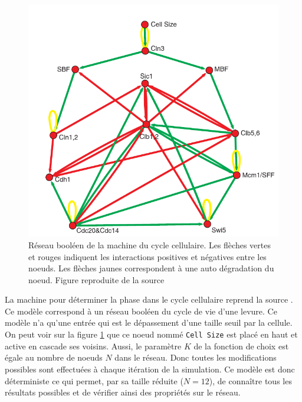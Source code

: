 \documentclass[11pt, a4paper]{article}
\begin{document}
\begin{figure}[position]
    \begin{center}
        \includegraphics[scale=0.335]{net_cycle}
        \caption{
            \label{net_cycle}
            Réseau booléen de la machine du cycle cellulaire. Les flèches
            vertes et rouges indiquent les interactions positives et négatives
            entre les noeuds. Les flèches jaunes correspondent à une auto
            dégradation du noeud.
            Figure reproduite de la source \cite{li2004}
        }
    \end{center}
\end{figure}

La machine  pour déterminer la phase dans le cycle cellulaire reprend la source
\cite{li2004}. Ce modèle correspond à un réseau booléen du cycle de vie d'une
levure. Ce modèle n'a qu'une entrée qui est le dépassement d'une taille seuil
par la cellule. On peut voir sur la figure \ref{net_cycle} que ce noeud nommé
\texttt{Cell Size} est placé en haut et active en cascade ses voisins. Aussi,
le paramètre $K$ de la fonction de choix est égale au nombre de noeuds $N$ dans
le réseau. Donc toutes les modifications possibles sont effectuées à chaque
itération de la simulation. Ce modèle est donc déterministe ce qui permet, par
sa taille réduite ($N = 12$), de connaître tous les résultats possibles et de
vérifier ainsi des propriétés sur le réseau.
\end{document}
